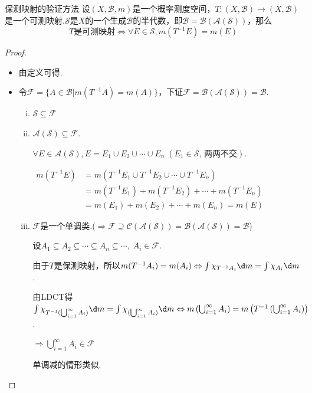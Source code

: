 \begin{theorem}{保测映射的验证方法}
    设$(X,\mathcal{B},m)$是一个概率测度空间，$T:(X,\mathcal{B}) \to (X,\mathcal{B})$是一个可测映射.$\mathcal{S}$是$X$的一个生成$\mathcal{B}$的半代数，即$\mathcal{B}=\mathcal{B}(\mathcal{A}(\mathcal{S}))$，那么
    \[ T\text{是可测映射} \Longleftrightarrow \forall E \in \mathcal{S},m(T^{-1}E) = m(E) \]
\end{theorem}
\begin{proof}
    \begin{itemize}[leftmargin = 3.5em]
        \item[“$\Rightarrow$”] 由定义可得.
        \item[“$\Leftarrow$”] 令$\mathcal{F} = \{A\in\mathcal{B}|m(T^{-1}A)=m(A)\}$，下证$\mathcal{F}=\mathcal{B}(\mathcal{A}(\mathcal{S}))=\mathcal{B}$.\par
        \begin{enumerate}[(i)]
            \item $\mathcal{S}\subseteq\mathcal{F}$
            \item $\mathcal{A}(\mathcal{S})\subseteq\mathcal{F}$.\par
            $\forall E\in\mathcal{A}(\mathcal{S}),E=E_1\cup E_2\cup\cdots\cup E_n \;(E_1\in\mathcal{S},\,\text{两两不交})$.\par
            $\begin{aligned}
                m(T^{-1}E) &= m(T^{-1}E_1\cup T^{-1}E_2\cup\cdots\cup T^{-1}E_n)\\
                &=m(T^{-1}E_1)+m(T^{-1}E_2)+\cdots+m(T^{-1}E_n)\\
                &=m(E_1)+m(E_2)+\cdots+m(E_n)=m(E)
            \end{aligned}$\par
            \item $\mathcal{F}$是一个单调类.($\Rightarrow \mathcal{F}\supseteq\mathcal{C}(\mathcal{A}(\mathcal{S}))=\mathcal{B}(\mathcal{A}(\mathcal{S}))=\mathcal{B}$)\par
            设$A_1\subseteq A_2\subseteq \cdots\subseteq A_n\subseteq\cdots,\;A_i\in\mathcal{F}$.\par
            由于$T$是保测映射，所以$m(T^{-1}A_i)=m(A_i) \Leftrightarrow \int{\chi_{T^{-1}A_i}}\d m=\int {\chi_{A_i}}\d m$.\par
            由LDCT得$\int{\chi_{T^{-1}(\bigcup_{i=1}^\infty{A_i})}}\d m=\int{\chi_{(\bigcup_{i=1}^\infty{A_i})}}\d m \Leftrightarrow m\left(\bigcup_{i=1}^\infty{A_i}\right) = m\left(T^{-1}\left(\bigcup_{i=1}^\infty{A_i}\right)\right)$.\par
            $\Rightarrow \bigcup_{i=1}^\infty{A_i}\in\mathcal{F}$\par
            单调减的情形类似.
        \end{enumerate}
    \end{itemize}
\end{proof}

